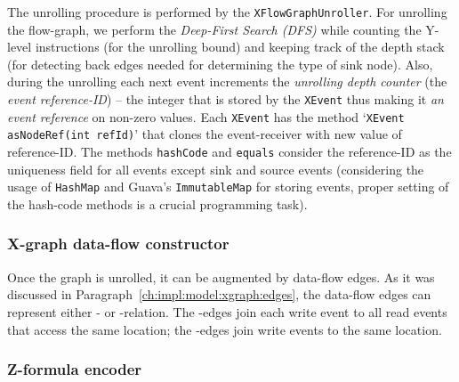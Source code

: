 The unrolling procedure is performed by the \texttt{XFlowGraphUnroller}. %
For unrolling the flow-graph, we perform the \textit{Deep-First Search (DFS)} while counting the Y-level instructions (for the unrolling bound) and keeping track of the depth stack (for detecting back edges needed for determining the type of sink node).
Also, during the unrolling each next event increments the \textit{unrolling depth counter} (the \textit{event reference-ID}) -- the integer that is stored by the \texttt{XEvent} thus making it \textit{an event reference} on non-zero values.
Each \texttt{XEvent} has the method `\texttt{XEvent asNodeRef(int refId)}' that clones the event-receiver with new value of reference-ID.
The methods \texttt{hashCode} and \texttt{equals} consider the reference-ID as the uniqueness field for all events except sink and source events (considering the usage of \texttt{HashMap} and Guava's \texttt{ImmutableMap} for storing events, proper setting of the hash-code methods is a crucial programming task).






\subsubsection{X-graph data-flow constructor}
\label{ch:impl:proc:x-df}

Once the graph is unrolled, it can be augmented by data-flow edges.
As it was discussed in Paragraph~\ref{ch:impl:model:xgraph:edges}, the data-flow edges can represent either \rf{}- or \co{}-relation.
The \rf{}-edges join each write event to all read events that access the same location; the \co{}-edges join write events to the same location.



\subsubsection{Z-formula encoder}
\label{ch:impl:proc:z-encoder}

